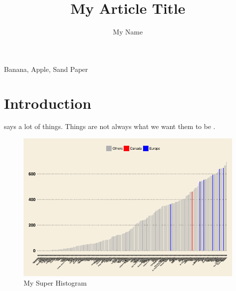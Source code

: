 \documentclass[preprint,12pt]{elsarticle} %
\begin{document}
\begin{frontmatter}
  \title{My Article Title}
  \author{My Name}
  \address{Universit\'e Laval}

  \begin{abstract}
    \lipsum[2]
  \end{abstract}

  \begin{keyword}
  Banana, Apple, Sand Paper
  \end{keyword}
\end{frontmatter}



\section{Introduction}



\citet{huntington1993clash} says a lot of things. Things are not always what we want them to be \citep{skocpol1999bringing}.





\lipsum[1]





\begin{figure}[h!]
  \caption{My Super Histogram}
  \centering
  \includegraphics[width=1\textwidth]{AlcoholConsumptionHistogram}
\end{figure}
\end{document}
